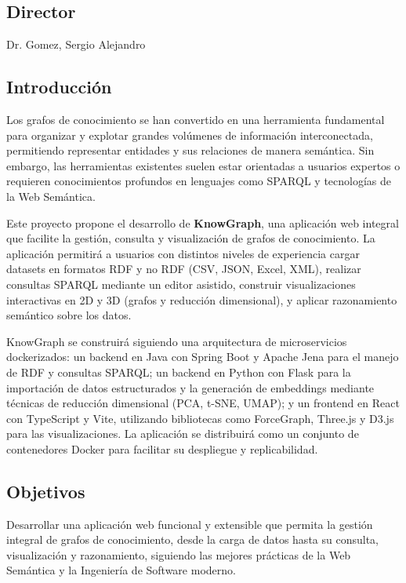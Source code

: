 \documentclass{article}
\begin{document}
\subsection*{Director}
Dr. Gomez, Sergio Alejandro

\subsection*{Introducción}
Los grafos de conocimiento se han convertido en una herramienta fundamental para organizar y explotar grandes volúmenes de información interconectada, permitiendo representar entidades y sus relaciones de manera semántica. Sin embargo, las herramientas existentes suelen estar orientadas a usuarios expertos o requieren conocimientos profundos en lenguajes como SPARQL y tecnologías de la Web Semántica.

Este proyecto propone el desarrollo de \textbf{KnowGraph}, una aplicación web integral que facilite la gestión, consulta y visualización de grafos de conocimiento. La aplicación permitirá a usuarios con distintos niveles de experiencia cargar datasets en formatos RDF y no RDF (CSV, JSON, Excel, XML), realizar consultas SPARQL mediante un editor asistido, construir visualizaciones interactivas en 2D y 3D (grafos y reducción dimensional), y aplicar razonamiento semántico sobre los datos.

KnowGraph se construirá siguiendo una arquitectura de microservicios dockerizados: un backend en Java con Spring Boot y Apache Jena para el manejo de RDF y consultas SPARQL; un backend en Python con Flask para la importación de datos estructurados y la generación de embeddings mediante técnicas de reducción dimensional (PCA, t-SNE, UMAP); y un frontend en React con TypeScript y Vite, utilizando bibliotecas como ForceGraph, Three.js y D3.js para las visualizaciones. La aplicación se distribuirá como un conjunto de contenedores Docker para facilitar su despliegue y replicabilidad.

\subsection*{Objetivos}
Desarrollar una aplicación web funcional y extensible que permita la gestión integral de grafos de conocimiento, desde la carga de datos hasta su consulta, visualización y razonamiento, siguiendo las mejores prácticas de la Web Semántica y la Ingeniería de Software moderno.
\end{document}
